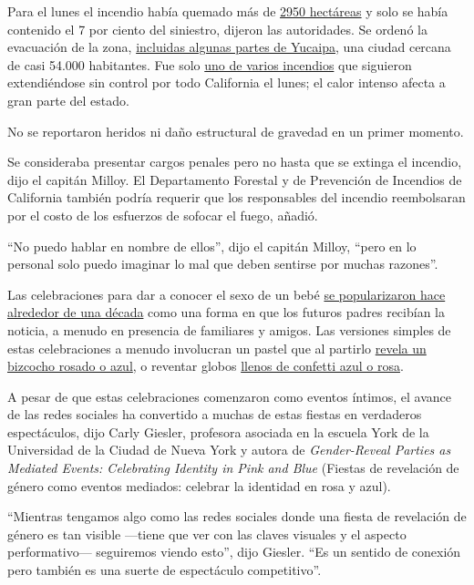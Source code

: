 Para el lunes el incendio había quemado más de
\href{https://www.fire.ca.gov/incidents/2020/9/5/el-dorado-fire/}{2950
hectáreas} y solo se había contenido el 7 por ciento del siniestro,
dijeron las autoridades. Se ordenó la evacuación de la zona,
\href{https://twitter.com/YucaipaPD/status/1303046104959692800}{incluidas
algunas partes de Yucaipa}, una ciudad cercana de casi 54.000
habitantes. Fue solo
\href{https://www.nytimes3xbfgragh.onion/2020/09/07/us/ca-wildfires-heatwave.html?action=click\&module=News\&pgtype=Homepage}{uno
de varios incendios} que siguieron extendiéndose sin control por todo
California el lunes; el calor intenso afecta a gran parte del estado.

No se reportaron heridos ni daño estructural de gravedad en un primer
momento.

Se consideraba presentar cargos penales pero no hasta que se extinga el
incendio, dijo el capitán Milloy. El Departamento Forestal y de
Prevención de Incendios de California también podría requerir que los
responsables del incendio reembolsaran por el costo de los esfuerzos de
sofocar el fuego, añadió.

``No puedo hablar en nombre de ellos'', dijo el capitán Milloy, ``pero
en lo personal solo puedo imaginar lo mal que deben sentirse por muchas
razones''.

Las celebraciones para dar a conocer el sexo de un bebé
\href{https://www.nytimes3xbfgragh.onion/es/2019/08/05/espanol/cultura/fiestas-revelacion-genero.html}{se
popularizaron hace alrededor de una década} como una forma en que los
futuros padres recibían la noticia, a menudo en presencia de familiares
y amigos. Las versiones simples de estas celebraciones a menudo
involucran un pastel que al partirlo
\href{https://www.bustle.com/p/these-gender-reveal-cake-memes-tweets-are-going-viral-for-the-best-reason-8286365}{revela
un bizcocho rosado o azul}, o reventar globos
\href{https://www.youtube.com/watch?v=TLAqvC3JWNM}{llenos de confetti
azul o rosa}.

A pesar de que estas celebraciones comenzaron como eventos íntimos, el
avance de las redes sociales ha convertido a muchas de estas fiestas en
verdaderos espectáculos, dijo Carly Giesler, profesora asociada en la
escuela York de la Universidad de la Ciudad de Nueva York y autora de
\emph{Gender-Reveal Parties as Mediated Events: Celebrating Identity in
Pink and Blue} (Fiestas de revelación de género como eventos mediados:
celebrar la identidad en rosa y azul).

``Mientras tengamos algo como las redes sociales donde una fiesta de
revelación de género es tan visible ---tiene que ver con las claves
visuales y el aspecto performativo--- seguiremos viendo esto'', dijo
Giesler. ``Es un sentido de conexión pero también es una suerte de
espectáculo competitivo''.

